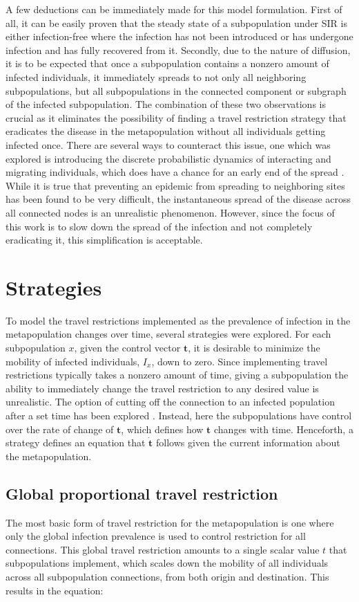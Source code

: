 A few deductions can be immediately made for this model formulation. First of all, it can be easily  proven that the steady state of a subpopulation under SIR is either infection-free where the infection has not been introduced or has undergone infection and has fully recovered from it. Secondly, due to the nature of diffusion, it is to be expected that once a subpopulation contains a nonzero amount of infected individuals, it immediately spreads to not only all neighboring subpopulations, but all subpopulations in the connected component or subgraph of the infected subpopulation. The combination of these two observations is crucial as it eliminates the possibility of finding a travel restriction strategy that eradicates the disease in the metapopulation without all individuals getting infected once. There are several ways to counteract this issue, one which was explored is introducing the discrete probabilistic dynamics of interacting and migrating individuals, which does have a chance for an early end of the spread \cite{colizza2008epidemic}. While it is true that preventing an epidemic  from spreading to neighboring sites has been found to be very difficult, the instantaneous spread of the disease across all connected nodes is an unrealistic phenomenon. However, since the focus of this work is to slow down the spread of the infection and not completely eradicating it, this simplification is acceptable. 

\section{Strategies}
To model the travel restrictions implemented as the prevalence of infection in the metapopulation changes over time, several strategies were explored. For each subpopulation $x$, given the control vector $\mathbf{t}$, it is desirable to minimize the mobility of infected individuals, $I_{x}$, down to zero. Since implementing travel restrictions typically takes a nonzero amount of time, giving a subpopulation the ability to immediately change the travel restriction to any desired value is unrealistic. The option of cutting off the connection to an infected population after a set time has been explored \cite{feng2020infectious}. Instead, here the subpopulations have control over the rate of change of $\mathbf{t}$, which defines how $\mathbf{t}$ changes with time. Henceforth, a strategy defines an equation that $\mathbf{\dot{t}}$ follows given the current information about the metapopulation.

\subsection{Global proportional travel restriction}
The most basic form of travel restriction for the metapopulation is one where only the global infection prevalence is used to control restriction for all connections. This global travel restriction amounts to a single scalar value $t$ that subpopulations implement, which scales down the mobility of all individuals across all subpopulation connections, from both origin and destination. This results in the equation:

